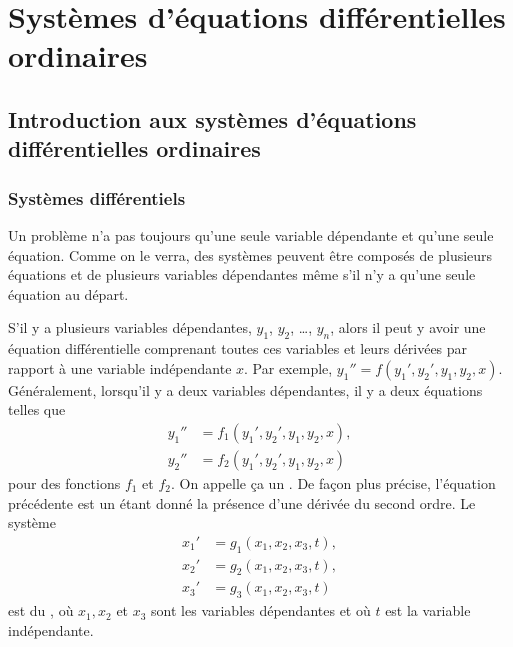 \chapter{Systèmes d'équations différentielles ordinaires} \label{sys:chapter}


\section{Introduction aux systèmes d'équations différentielles ordinaires} \label{sec:introtosys}


\subsection{Systèmes différentiels}

Un problème n'a pas toujours qu'une seule variable dépendante et qu'une seule équation. Comme on le verra, des systèmes peuvent être composés de plusieurs équations et de plusieurs variables dépendantes même s'il n'y a qu'une seule équation au départ.

S'il y a plusieurs variables dépendantes, $y_1$, $y_2$, \ldots, $y_n$,
alors
il peut y avoir une équation différentielle comprenant toutes ces variables et leurs dérivées par rapport à une variable indépendante $x$.
Par exemple, $y_1'' = f(y_1',y_2',y_1,y_2,x)$.
Généralement, lorsqu'il y a deux variables dépendantes, il y a deux équations telles que
\begin{align*}
y_1'' & = f_1(y_1',y_2',y_1,y_2,x) , \\
y_2'' & = f_2(y_1',y_2',y_1,y_2,x)
\end{align*}
pour des fonctions $f_1$ et $f_2$. On appelle ça un
\emph{}.
De façon plus précise, l'équation précédente est un \emph{}
étant donné la présence d'une dérivée du second ordre. Le système
\begin{align*}
x_1' & = g_1(x_1,x_2,x_3,t) , \\
x_2' & = g_2(x_1,x_2,x_3,t) , \\
x_3' & = g_3(x_1,x_2,x_3,t) 
\end{align*}
est du \emph{}, où $x_1,x_2$ et $x_3$ sont les variables dépendantes et où $t$ est la variable indépendante.

